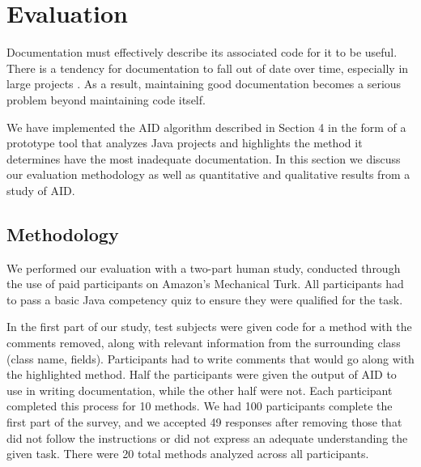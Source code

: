 \documentclass[preprint]{sigplanconf}
\begin{document}
\section{Evaluation}
Documentation must effectively describe its associated code for it to be useful. There is a tendency for documentation to fall out of date over time, especially in large projects \cite{forward}. As a result, maintaining good documentation becomes a serious problem beyond maintaining code itself.

We have implemented the AID algorithm described in Section 4 in the form of a prototype tool that analyzes Java projects and highlights the method it determines have the most inadequate documentation. In this section we discuss our evaluation methodology as well as quantitative and qualitative results from a study of AID.

\subsection{Methodology}
We performed our evaluation with a two-part human study, conducted through the use of paid participants on Amazon's Mechanical Turk. All participants had to pass a basic Java competency quiz to ensure they were qualified for the task.

In the first part of our study, test subjects were given code for a method with the comments removed, along with relevant information from the surrounding class (class name, fields). Participants had to write comments that would go along with the highlighted method. Half the participants were given the output of AID to use in writing documentation, while the other half were not. Each participant completed this process for 10 methods. We had 100 participants complete the first part of the  survey, and we accepted 49 responses after removing those that did not follow the instructions or did not express an adequate understanding the given task. There were 20 total methods analyzed across all participants.
\end{document}
